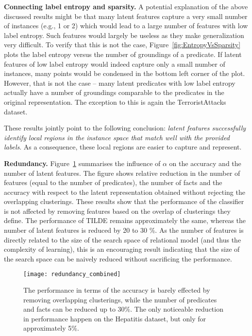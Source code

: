 \textbf{Connecting label entropy and sparsity.}
A potential explanation of the above discussed results might be that many latent features capture a very small number of instances (e.g., 1 or 2) which would lead to a large number of features with low label entropy.
Such features would largely be useless as they make generalization very difficult.
To verify that this is not the case, Figure~\ref{fig:EntropyVsSparsity} plots the label entropy versus the number of groundings of a predicate.
If latent features of low label entropy would indeed capture only a small number of instances, many points would be condensed in the bottom left corner of the plot.
However, that is not the case -- many latent predicates with low label entropy actually have a number of groundings comparable to the predicates in the original representation.
The exception to this is again the TerroristAttacks dataset.

These results jointly point to the following conclusion: \textit{latent features successfully identify local regions in the instance space that match well with the provided labels}.
As a consequence, these local regions are easier to capture and represent.









\textbf{Redundancy.}
Figure~\ref{fig:Redundancy} summarises the influence of $\alpha$ on the accuracy and the number of latent features.
The figure shows relative reduction in the number of features (equal to the number of predicates), the number of facts and the accuracy with  respect to the latent representation obtained without rejecting the overlapping clusterings.
These results show that the performance of the classifier is not affected by removing features based on the overlap of clusterings they define.
The performance of TILDE remains approximately the same, whereas the number of latent features is reduced by 20 to 30 \%.
As the number of features is directly related to the size of the search space of relational model (and thus the complexity of learning), this is an encouraging result indicating that the size of the search space can be naively reduced without sacrificing the performance.








\begin{figure}[t]
	\centering
	\medskip
    \texttt{[image: redundancy\_combined]}
    \caption[Redundancy in latent representations created by \gls{curled}]{The performance in terms of the accuracy is barely effected by removing overlapping clusterings, while the number of predicates and facts can be reduced up to 30\%. The only noticeable reduction in performance happen on the Hepatitis dataset, but only for approximately 5\%.   }
    \label{fig:Redundancy}
\end{figure}







